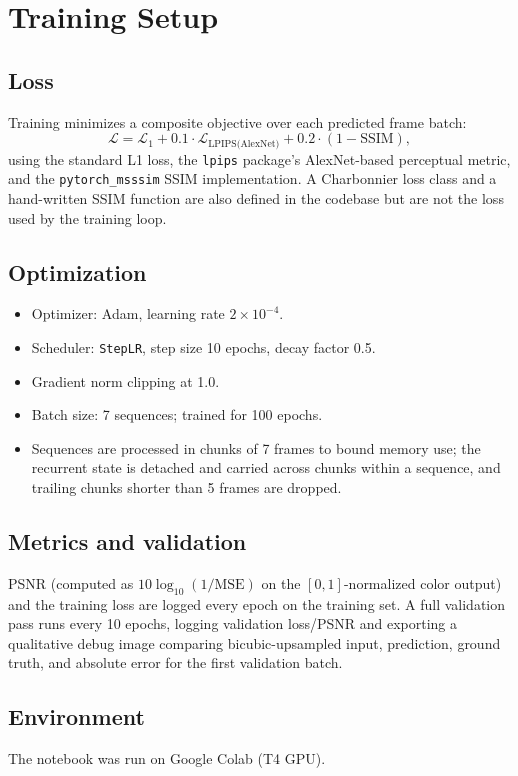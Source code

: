\documentclass[11pt]{article}
\begin{document}
\section{Training Setup}

\subsection{Loss}
Training minimizes a composite objective over each predicted frame batch:
\[
\mathcal{L} = \mathcal{L}_{1} + 0.1\cdot\mathcal{L}_{\text{LPIPS(AlexNet)}} + 0.2\cdot\left(1 - \text{SSIM}\right),
\]
using the standard L1 loss, the \texttt{lpips} package's AlexNet-based perceptual metric, and the \texttt{pytorch\_msssim} SSIM implementation. A Charbonnier loss class and a hand-written SSIM function are also defined in the codebase but are not the loss used by the training loop.

\subsection{Optimization}
\begin{itemize}[itemsep=2pt]
    \item Optimizer: Adam, learning rate $2\times10^{-4}$.
    \item Scheduler: \texttt{StepLR}, step size 10 epochs, decay factor 0.5.
    \item Gradient norm clipping at 1.0.
    \item Batch size: 7 sequences; trained for 100 epochs.
    \item Sequences are processed in chunks of 7 frames to bound memory use; the recurrent state is detached and carried across chunks within a sequence, and trailing chunks shorter than 5 frames are dropped.
\end{itemize}

\subsection{Metrics and validation}
PSNR (computed as $10\log_{10}(1/\text{MSE})$ on the $[0,1]$-normalized color output) and the training loss are logged every epoch on the training set. A full validation pass runs every 10 epochs, logging validation loss/PSNR and exporting a qualitative debug image comparing bicubic-upsampled input, prediction, ground truth, and absolute error for the first validation batch.

\subsection{Environment}
The notebook was run on Google Colab (T4 GPU). 
\end{document}
